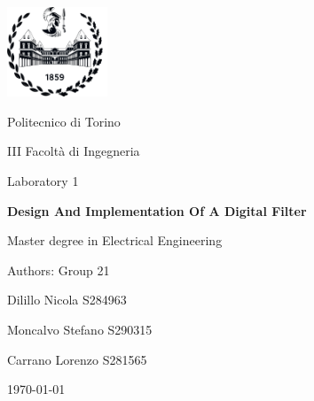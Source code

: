 \documentclass[11pt,  english, makeidx, a4paper, titlepage, oneside]{book}
\begin{document}
\frontmatter
\begin{titlepage}
\vspace{2cm}
\centerline{
\includegraphics[width=3cm]{./logopoli_new.png}} 
\vspace{0.5cm}
\centerline{\LARGE Politecnico di Torino}
\bigskip
\centerline{\Large III Facolt\`a di Ingegneria}
\vspace{3.5cm}
\centerline{\Huge\sf Laboratory 1}
\bigskip
\centerline{\Huge\bfseries\sf Design And Implementation Of A Digital Filter}
\vspace{2cm}
\centerline{\LARGE Master degree in Electrical Engineering}
\vspace{4cm}
%
\centerline{\Large Authors: Group 21}
\vspace{2cm}
%
%
\centerline{Dilillo Nicola S284963}
\centerline{Moncalvo Stefano S290315}
\centerline{Carrano Lorenzo S281565}
%
\vspace{1cm}
\centerline{\today}
\vspace{1cm}
\end{titlepage}

\tableofcontents

% 
\mainmatter
\lstset{language=VHDL}

%    
%


% 
%
%    
%
%
%
%
 
\end{document}
